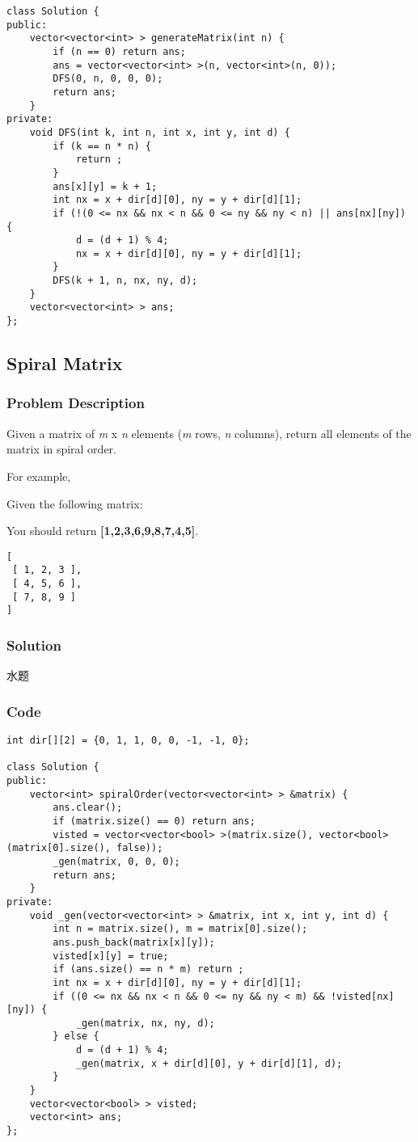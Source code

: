 \documentclass[courier]{article}
\begin{document}
\begin{CJK*}{UTF8}{gkai}
\begin{lstlisting}
class Solution {
public:
    vector<vector<int> > generateMatrix(int n) {
        if (n == 0) return ans;
        ans = vector<vector<int> >(n, vector<int>(n, 0));
        DFS(0, n, 0, 0, 0);
        return ans;
    }
private:
    void DFS(int k, int n, int x, int y, int d) {
        if (k == n * n) {
            return ;
        }
        ans[x][y] = k + 1;
        int nx = x + dir[d][0], ny = y + dir[d][1];
        if (!(0 <= nx && nx < n && 0 <= ny && ny < n) || ans[nx][ny]) {
            d = (d + 1) % 4;
            nx = x + dir[d][0], ny = y + dir[d][1];
        }
        DFS(k + 1, n, nx, ny, d);
    }
    vector<vector<int> > ans;
};

\end{lstlisting}


\subsection{ Spiral Matrix }

\subsubsection*{Problem Description}
Given a matrix of \emph{m} x \emph{n} elements (\emph{m} rows, \emph{n} columns), return all elements of the matrix in spiral order.

For example,


Given the following matrix:

You should return \textbf{[1,2,3,6,9,8,7,4,5]}.

\begin{verbatim}
[
 [ 1, 2, 3 ],
 [ 4, 5, 6 ],
 [ 7, 8, 9 ]
]
\end{verbatim}


\subsubsection*{Solution}
水题

\subsubsection*{Code}
\begin{lstlisting}
int dir[][2] = {0, 1, 1, 0, 0, -1, -1, 0};

class Solution {
public:
    vector<int> spiralOrder(vector<vector<int> > &matrix) {
        ans.clear();
        if (matrix.size() == 0) return ans;
        visted = vector<vector<bool> >(matrix.size(), vector<bool>(matrix[0].size(), false));
        _gen(matrix, 0, 0, 0);
        return ans;
    }
private:
    void _gen(vector<vector<int> > &matrix, int x, int y, int d) {
        int n = matrix.size(), m = matrix[0].size();
        ans.push_back(matrix[x][y]);
        visted[x][y] = true;
        if (ans.size() == n * m) return ;
        int nx = x + dir[d][0], ny = y + dir[d][1];
        if ((0 <= nx && nx < n && 0 <= ny && ny < m) && !visted[nx][ny]) {
            _gen(matrix, nx, ny, d);
        } else {
            d = (d + 1) % 4;
            _gen(matrix, x + dir[d][0], y + dir[d][1], d);
        }
    }
    vector<vector<bool> > visted;
    vector<int> ans;
}; 
\end{lstlisting}



\end{CJK*}
\end{document}
